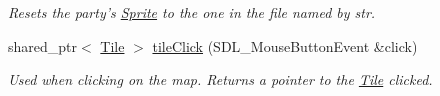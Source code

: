 \begin{DoxyCompactItemize}
\begin{DoxyCompactList}\small\item\em Resets the party’s \hyperlink{class_sprite}{Sprite} to the one in the file named by str. \end{DoxyCompactList}\item 
shared\+\_\+ptr$<$ \hyperlink{class_tile}{Tile} $>$ \hyperlink{class_party_af38511e79b486f468c4f3d8e7be0cd1a}{tile\+Click} (S\+D\+L\+\_\+\+Mouse\+Button\+Event \&click)\hypertarget{class_party_af38511e79b486f468c4f3d8e7be0cd1a}{}\label{class_party_af38511e79b486f468c4f3d8e7be0cd1a}

\begin{DoxyCompactList}\small\item\em Used when clicking on the map. Returns a pointer to the \hyperlink{class_tile}{Tile} clicked. \end{DoxyCompactList}\end{DoxyCompactItemize}
